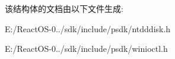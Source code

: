 该结构体的文档由以下文件生成\+:\begin{DoxyCompactItemize}
\item 
E\+:/\+React\+O\+S-\/0../sdk/include/psdk/ntdddisk.\+h\item 
E\+:/\+React\+O\+S-\/0../sdk/include/psdk/winioctl.\+h\end{DoxyCompactItemize}
